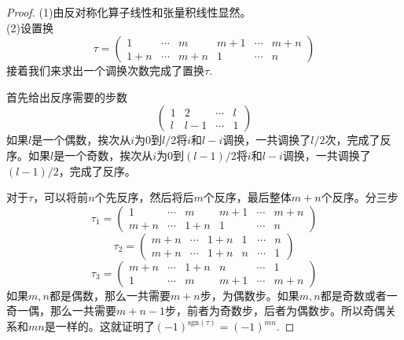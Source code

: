 \documentclass[11pt,a4paper,openany]{book}%
\theoremstyle{plain}%
\begin{document}
\begin{proof}

(1)由反对称化算子线性和张量积线性显然。\\
(2)设置换
\[
\tau=
\begin{pmatrix}
1& \cdots & m & m+1 &\cdots &m+n\\
1+n& \cdots & m+n & 1 &\cdots &n
\end{pmatrix}
\]
接着我们来求出一个调换次数完成了置换$\tau$.

首先给出反序需要的步数
\[
\begin{pmatrix}
1&2& \cdots &l\\
l&l-1& \cdots & 1
\end{pmatrix}
\]
\indent 如果$l$是一个偶数，挨次从$i$为$0$到$l/2$将$i$和$l-i$调换，一共调换了$l/2$次，完成了反序。如果$l$是一个奇数，挨次从$i$为$0$到$(l-1)/2$将$i$和$l-i$调换，一共调换了$(l-1)/2$，完成了反序。

对于$\tau$，可以将前$n$个先反序，然后将后$m$个反序，最后整体$m+n$个反序。分三步
\[
\tau_1=
\begin{pmatrix}
1& \cdots & m & m+1 &\cdots &m+n\\
m+n& \cdots & 1+n & 1 &\cdots &n
\end{pmatrix}
\]
\[
\tau_2=
\begin{pmatrix}
m+n& \cdots & 1+n & 1 &\cdots &n\\
m+n& \cdots & 1+n & n &\cdots &1
\end{pmatrix}
\]
\[
\tau_3=
\begin{pmatrix}
m+n& \cdots & 1+n & n &\cdots &1\\
1& \cdots & m & m+1 &\cdots &m+n
\end{pmatrix}
\]
如果$m,n$都是偶数，那么一共需要$m+n$步，为偶数步。如果$m,n$都是奇数或者一奇一偶，那么一共需要$m+n-1$步，前者为奇数步，后者为偶数步。所以奇偶关系和$mn$是一样的。这就证明了$(-1)^{\mathrm{sgn}(\tau)}=(-1)^{mn}$.


\end{proof}
\end{document}
